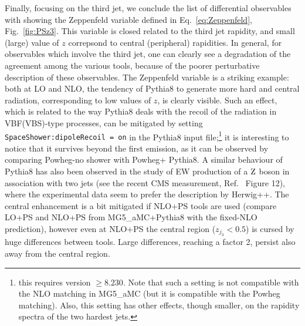 Finally, focusing on the third jet, we conclude the list of differential observables with showing the Zeppenfeld variable defined in Eq.~\eqref{eq:Zeppenfeld}, Fig.~\ref{fig:PSz3}. This 
variable is closed related to the third jet rapidity, and small (large) value of $z$ correpsond to central (peripheral) rapidities. In general, for observables which involve the third jet, one
can clearly see a degradation of the agreement among the various tools, because of the poorer perturbative description of these observables. The Zeppenfeld variable is 
a striking example: both at LO and NLO, the tendency of {\sc Pythia8} to generate more hard and central radiation, corresponding to low values of $z$,
is clearly visible. Such an effect, which is related to the way {\sc Pythia8} deals with the recoil of the radiation in VBF(VBS)-type processes,
can be mitigated by setting {\tt SpaceShower:dipole\-Recoil = on} in the {\sc Pythia8} input file;\footnote{this requires version $\ge8.230$. 
Note that such a setting is not compatible with the NLO matching
in {\sc MG5\_aMC} (but it is compatible with the {\sc Powheg} matching). Also, this setting has other effects, though smaller, on the rapidity spectra of the two hardest jets.} it is interesting to notice that
it survives beyond the first emission, as it can be observed by comparing {\sc Powheg-no shower} with {\sc Powheg+ Pythia8}. A similar
behaviour of {\sc Pythia8}
has also been observed in the study of EW production of a $\text{Z}$ boson in association with two jets (see the recent CMS measurement, 
Ref.~\cite{Sirunyan:2017jej} Figure 12), where the experimental data seem to prefer the description by {\sc Herwig++}. 
The central enhancement
is a bit mitigated if NLO+PS tools are used (compare LO+PS and NLO+PS from {\sc MG5\_aMC+Pythia8} with the fixed-NLO prediction), however even at NLO+PS the central region
($z_{j_3}<0.5$) is cursed by huge differences between tools. Large differences, reaching a factor 2, persist also away from the central region. \\

